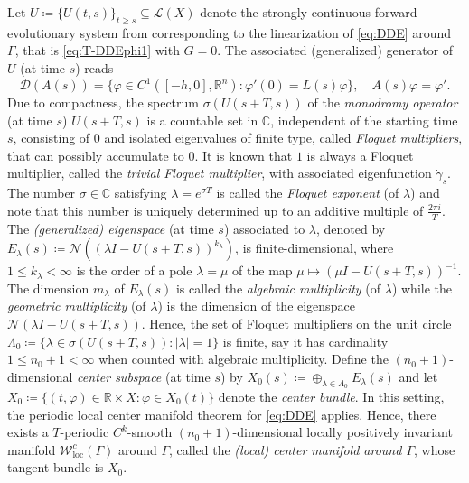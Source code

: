 \documentclass[english]{myarticle}
\DeclareMathOperator{\loc}{loc}
\begin{document}
\begin{sloppypar}
Let $U \coloneqq \{U(t,s)\}_{t \geq s} \subseteq \mathcal{L}(X)$ denote the strongly continuous forward evolutionary system from \cite[Theorem XII.2.7 and XII.3.1]{Diekmann1995} corresponding to the linearization of \eqref{eq:DDE} around $\Gamma$, that is \eqref{eq:T-DDEphi1} with $G = 0$. The associated (generalized) generator of $U$ (at time $s$) reads
\begin{equation} \label{eq:D(As)}
    \mathcal{D}(A(s)) = \{ \varphi \in C^1([-h,0],\mathbb{R}^n) : \varphi'(0) = L(s) \varphi \}, \quad A(s)\varphi = \varphi'.
\end{equation}
Due to compactness, the spectrum $\sigma(U(s+T,s))$ of the \emph{monodromy operator} (at time $s$) $U(s+T,s)$ is a countable set in $\mathbb{C}$, independent of the starting time $s$, consisting of $0$ and isolated eigenvalues of finite type, called \emph{Floquet multipliers}, that can possibly accumulate to $0$. It is known that $1$ is always a Floquet multiplier, called the \emph{trivial Floquet multiplier}, with associated eigenfunction $\dot{\gamma}_s$. The number $\sigma \in \mathbb{C}$ satisfying $\lambda = e^{\sigma T}$ is called the \emph{Floquet exponent} (of $\lambda$) and note that this number is uniquely determined up to an additive multiple of $\frac{2 \pi i }{T}$. The \emph{(generalized) eigenspace} (at time $s$) associated to $\lambda$, denoted by $E_\lambda(s) \coloneqq \mathcal{N} ((\lambda I - U(s+T,s))^{k_\lambda})$, is finite-dimensional, where $1 \leq k_\lambda < \infty$ is the order of a pole $\lambda = \mu$ of the map $\mu \mapsto (\mu I - U(s+T,s))^{-1}$. The dimension $m_\lambda$ of $E_\lambda(s)$ is called the \emph{algebraic multiplicity} (of $\lambda$) while the \emph{geometric multiplicity} (of $\lambda$) is the dimension of the eigenspace $\mathcal{N} (\lambda I - U(s+T,s))$. Hence, the set of Floquet multipliers on the unit circle $\Lambda_0 \coloneqq \{ \lambda \in \sigma(U(s+T,s)) : |\lambda| = 1\}$ is finite, say it has cardinality $1 \leq n_0 + 1 < \infty$ when counted with algebraic multiplicity. Define the $(n_0 +1)$-dimensional \emph{center subspace} (at time $s$) by $X_0(s) \coloneqq \oplus_{\lambda \in \Lambda_0} E_{\lambda}(s)$ and let $X_0 \coloneqq \{ (t,\varphi) \in \mathbb{R} \times X : \varphi \in X_0(t) \}$ denote the \emph{center bundle}. In this setting, the periodic local center manifold theorem \cite[Corollary 15]{Article1} for \eqref{eq:DDE} applies. Hence, there exists a $T$-periodic $C^k$-smooth $(n_0+1)$-dimensional locally positively invariant manifold $\mathcal{W}_{\loc}^{c}(\Gamma)$ around $\Gamma$, called the \emph{(local) center manifold around $\Gamma$}, whose tangent bundle is $X_0$.


\end{sloppypar}
\end{document}
